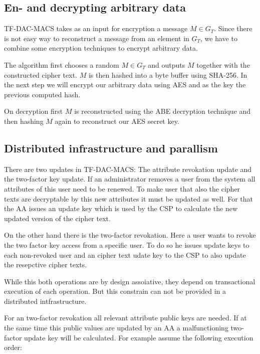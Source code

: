 \subsection{En- and decrypting arbitrary data}
TF-DAC-MACS takes as an input for encryption a message $M \in G_T$. Since there is not easy way to reconstruct a message from an element in $G_T$, we have to combine some encryption techniques to encrypt arbitrary data. 

The algorithm first chooses a random $M \in G_T$ and outputs $M$ together with the constructed cipher text. $M$ is then hashed into a byte buffer using \ac{SHA}-256. In the next step we will encrypt our arbitrary data using \ac{AES} and as the key the previous computed hash. 

On decryption first $M$ is reconstructed using the ABE decryption technique and then hashing $M$ again to reconstruct our AES secret key.


\subsection{Distributed infrastructure and parallism}

There are two updates in TF-DAC-MACS: The attribute revokation update and the two-factor key update. If an administrator removes a user from the system all attributes of this user need to be renewed. To make user that also the cipher texts are decryptable by this new attributes it must be updated as well. For that the AA issues an update key which is used by the CSP to calculate the new updated version of the cipher text. 

On the other hand there is the two-factor revokation. Here a user wants to revoke the two factor key access from a specific user. To do so he issues update keys to each non-revoked user and an cipher text udate key to the CSP to also update the resepctive cipher texts.

While this both operations are by design assoiative, they depend on transactional execution of each operation. But this constrain can not be provided in a distributed intfrastructure. 

For an two-factor revokation all relevant attribute public keys are needed. If at the same time this public values are updated by an AA a malfunctioning two-factor update key will be calculated. For example assume the following execution order:


